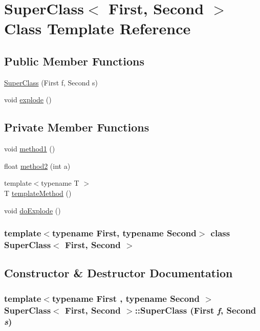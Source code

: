 \hypertarget{classSuperClass}{
\section{SuperClass$<$ First, Second $>$ Class Template Reference}
\label{classSuperClass}
}
\subsection*{Public Member Functions}
\begin{CompactItemize}
\item 
\hyperlink{classSuperClass_7dd6683b359a73f7de331403ad162b94}{SuperClass} (First f, Second s)
\item 
void \hyperlink{classSuperClass_133e840cef38bc1ab588bbd8f8939138}{explode} ()
\end{CompactItemize}
\subsection*{Private Member Functions}
\begin{CompactItemize}
\item 
void \hyperlink{classSuperClass_4af674d97b2d5f49e2f7c702e7a10176}{method1} ()
\item 
float \hyperlink{classSuperClass_0f23effce4d4ffd422ba74fb2746234f}{method2} (int a)
\item 
{\footnotesize template$<$typename T $>$ }\\T \hyperlink{classSuperClass_109bd7b6ec3f8af4ede4f7e499cae3f1}{templateMethod} ()
\item 
void \hyperlink{classSuperClass_72c9fd754b4bf124d14bab7ef64f5721}{doExplode} ()
\end{CompactItemize}
\subsubsection*{template$<$typename First, typename Second$>$ class SuperClass$<$ First, Second $>$}



\subsection{Constructor \& Destructor Documentation}
\hypertarget{classSuperClass_7dd6683b359a73f7de331403ad162b94}{
\subsubsection[{SuperClass}]{\setlength{\rightskip}{0pt plus 5cm}template$<$typename First , typename Second $>$ {\bf SuperClass}$<$ First, Second $>$::{\bf SuperClass} (First {\em f}, \/  Second {\em s})}}
\label{classSuperClass_7dd6683b359a73f7de331403ad162b94}




